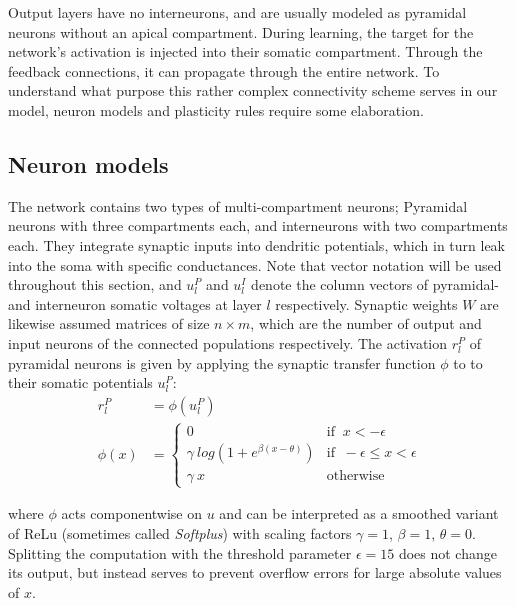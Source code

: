 Output layers have no interneurons, and are usually modeled as pyramidal neurons without an apical compartment. During
learning, the target for the network's activation is injected into their somatic compartment. Through the feedback
connections, it can propagate through the entire network. To understand what purpose this rather complex connectivity
scheme serves in our model, neuron models and plasticity rules require some elaboration.


\subsection{Neuron models}\label{sec-neurons}



The network contains two types of multi-compartment neurons; Pyramidal neurons with three compartments each, and
interneurons with two compartments each. They integrate synaptic inputs into dendritic potentials, which in turn leak
into the soma with specific conductances. Note that vector notation will be used throughout this section, and $u_l^P$
and $u_l^I$ denote the column vectors of pyramidal- and interneuron somatic voltages at layer $l$ respectively. Synaptic
weights $W$ are likewise assumed matrices of size $n \times m$, which are the number of output and input neurons of the
connected populations respectively. The activation $r_l^P$ of pyramidal neurons is given by applying the synaptic
transfer function $\phi$ to to their somatic potentials $u_l^P$:
\begin{align}
  r_l^P   & = \phi(u_l^P)                                                                      \\
  \phi(x) & = \begin{cases}
                0                                   & \textrm{if } \ x < -\epsilon               \\
                \gamma \ log(1+e^{\beta(x-\theta)}) & \textrm{if } \ -\epsilon \leq x < \epsilon \\
                \gamma \ x                          & \textrm{otherwise}
              \end{cases}
\end{align}

where $\phi$ acts componentwise on $u$ and can be interpreted as a smoothed variant of ReLu (sometimes called
\textit{Softplus}) with scaling factors $\gamma=1$, $\beta=1$, $\theta=0$. Splitting the computation with the threshold
parameter $\epsilon=15$ does not change its output, but instead serves to prevent overflow errors for large absolute
values of $x$.

